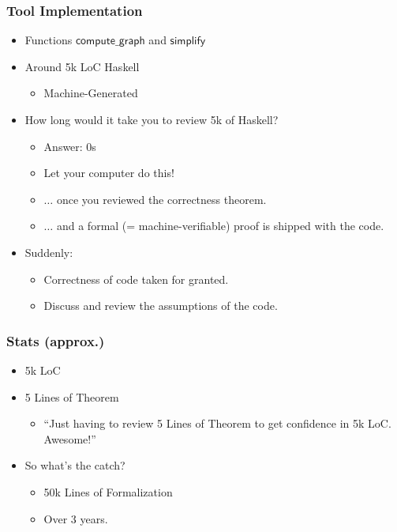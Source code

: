 \documentclass[aspectratio=169]{beamer}
\newcommand{\mdef}[1]{\ensuremath{\mathsf{#1}}}
\newcommand{\mfun}[1]{\mdef{#1}}
\begin{document}
\begin{frame}
	\frametitle{Tool Implementation}
		\begin{itemize}
			\item Functions $\mfun{compute\_graph}$ and $\mfun{simplify}$
			\item<2-> Around 5k LoC Haskell
			\begin{itemize}
				\item<3-> Machine-Generated
			\end{itemize}
			\item<4-> How long would it take you to review 5k of  Haskell?
			\begin{itemize}
				\item<6-> Answer: 0s
				\item<7-> Let your computer do this!
				\item<8-> $\dots$ once you reviewed the correctness theorem.
				\item<9-> $\dots$ and a formal (= machine-verifiable) proof is shipped with the code.
			\end{itemize}
			\item<10-> Suddenly:
			\begin{itemize}
				\item Correctness of code \alert{taken for granted}.
				\item Discuss and review the \alert{assumptions} of the code.
			\end{itemize}
		\end{itemize}
\end{frame}



\begin{frame}
	\frametitle{Stats (approx.)}
	\begin{itemize}
		\item 5k LoC
		\item 5 Lines of Theorem
		\begin{itemize}
			\item<2-> ``Just having to review 5 Lines of Theorem to get confidence in 5k LoC. Awesome!''
		\end{itemize}
		\item<3-> So what's the catch?
		\begin{itemize}
			\item<4-> 50k Lines of Formalization
			\item<4-> Over 3 years.
		\end{itemize}
	\end{itemize}
\end{frame}
\end{document}
